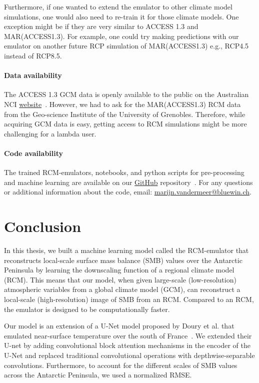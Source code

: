 \documentclass[a4paper,11pt,oneside]{report}
\begin{document}
Furthermore, if one wanted to extend the emulator to other climate model simulations, one would also need to re-train it for those climate models. One exception might be if they are very similar to ACCESS 1.3 and MAR(ACCESS1.3). For example, one could try making predictions with our emulator on another future RCP simulation of MAR(ACCESS1.3) e.g., RCP4.5 instead of RCP8.5.  

\subsubsection{Data availability}
The ACCESS 1.3 GCM data is openly available to the public on the Australian NCI \href{https://esgf.nci.org.au/search/esgf-nci/}{website}~\cite{NCI}. However, we had to ask for the MAR(ACCESS1.3) RCM data from the Geo-science Institute of the University of Grenobles. Therefore, while acquiring GCM data is easy, getting access to RCM simulations might be more challenging for a lambda user.

\subsubsection{Code availability}
The trained RCM-emulators, notebooks, and python scripts for pre-processing and machine learning are available on our \href{https://github.com/marvande/master-thesis}{GitHub} repository~\cite{GitHub}. For any questions or additional information about the code, email: \href{mailto:marijn.vandermeer@bluewin.ch}{marijn.vandermeer@bluewin.ch}. 


\chapter{Conclusion}

In this thesis, we built a machine learning model called the RCM-emulator that reconstructs local-scale surface mass balance (SMB) values over the Antarctic Peninsula by learning the downscaling function of a regional climate model (RCM). This means that our model, when given large-scale (low-resolution) atmospheric variables from a global climate model (GCM), can reconstruct a local-scale (high-resolution) image of SMB from an RCM. Compared to an RCM, the emulator is designed to be computationally faster.   

Our model is an extension of a U-Net model proposed by Doury et al. that emulated near-surface temperature over the south of France~\cite{Doury}. We extended their U-net by adding convolutional block attention mechanisms in the encoder of the U-Net and replaced traditional convolutional operations with depthwise-separable convolutions. Furthermore, to account for the different scales of SMB values across the Antarctic Peninsula, we used a normalized RMSE. 
\end{document}
